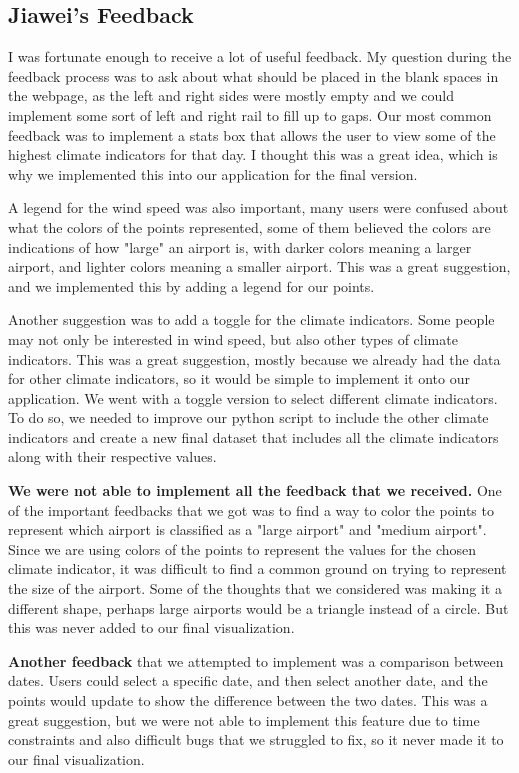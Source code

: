 \documentclass[9pt,twocolumn,twoside]{opticajnl}
\begin{document}
\subsection{Jiawei's Feedback}
I was fortunate enough to receive a lot of useful feedback. My question during the feedback process was to ask about what should be placed in the blank spaces in the webpage, as the left and right sides were mostly empty and we could implement some sort of left and right rail to fill up to gaps. Our most common feedback was to implement a stats box that allows the user to view some of the highest climate indicators for that day. I thought this was a great idea, which is why we implemented this into our application for the final version.

A legend for the wind speed was also important, many users were confused about what the colors of the points represented, some of them believed the colors are indications of how "large" an airport is, with darker colors meaning a larger airport, and lighter colors meaning a smaller airport. This was a great suggestion, and we implemented this by adding a legend for our points.

Another suggestion was to add a toggle for the climate indicators. Some people may not only be interested in wind speed, but also other types of climate indicators. This was a great suggestion, mostly because we already had the data for other climate indicators, so it would be simple to implement it onto our application. We went with a toggle version to select different climate indicators. To do so, we needed to improve our python script to include the other climate indicators and create a new final dataset that includes all the climate indicators along with their respective values. 

\textbf{We were not able to implement all the feedback that we received.} One of the important feedbacks that we got was to find a way to color the points to represent which airport is classified as a "large airport" and "medium airport". Since we are using colors of the points to represent the values for the chosen climate indicator, it was difficult to find a common ground on trying to represent the size of the airport. Some of the thoughts that we considered was making it a different shape, perhaps large airports would be a triangle instead of a circle. But this was never added to our final visualization.

\textbf{Another feedback} that we attempted to implement was a comparison between dates. Users could select a specific date, and then select another date, and the points would update to show the difference between the two dates. This was a great suggestion, but we were not able to implement this feature due to time constraints and also difficult bugs that we struggled to fix, so it never made it to our final visualization.
\end{document}
